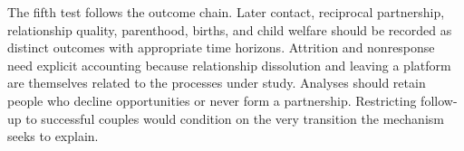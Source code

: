 The fifth test follows the outcome chain. Later contact, reciprocal partnership, relationship quality, parenthood, births, and child welfare should be recorded as distinct outcomes with appropriate time horizons. Attrition and nonresponse need explicit accounting because relationship dissolution and leaving a platform are themselves related to the processes under study. Analyses should retain people who decline opportunities or never form a partnership. Restricting follow-up to successful couples would condition on the very transition the mechanism seeks to explain.


